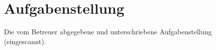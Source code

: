 \section{Aufgabenstellung}
Die vom Betreuer abgegebene und unterschriebene Aufgabenstellung (eingescannt). 